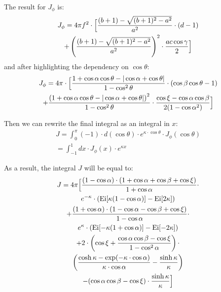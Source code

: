 The result for $J_{\phi}$ is:
\begin{multline}
J_{\phi} = 4\pi f^2 \cdot \Bigl[ \frac{(b+1) - \sqrt{(b+1)^2 - a^2}}{a^2} \cdot (d-1) \\ 
+ \left(\frac{(b+1) - \sqrt{(b+1)^2 - a^2}}{a^2}\right)^2 \cdot \frac{ac \cos \gamma}{2} \Bigr]
\end{multline}
and after highlighting the dependency on $\cos\theta$:
\begin{multline}
J_{\phi} = 4\pi \cdot \Bigl[ \frac{1 + \cos \alpha \cos \theta - |\cos \alpha + \cos \theta|}{1 - \cos^2 \theta} \cdot (\cos \beta \cos \theta - 1) \\ 
+ \frac{\left(1 + \cos \alpha \cos \theta - |\cos \alpha + \cos \theta|\right)^2}{1 - \cos^2 \theta} \cdot \frac{\cos \xi - \cos \alpha \cos \beta}{2 (1 - \cos \alpha^2)}\Bigr] 
\end{multline}

Then we can rewrite the final integral as an integral in $x$:
\begin{multline}
J = \int_{0}^{\pi} (-1) \cdot d(\cos \theta) \cdot e^{\kappa \cdot \cos \theta} \cdot J_{\phi}(\cos \theta) \\
= \int_{-1}^{1} dx \cdot J_{\phi}(x) \cdot e^{\kappa x} 
\end{multline}

As a result, the integral $J$ will be equal to:
\begin{multline}
J = 4 \pi \Bigl[ \frac{(1-\cos \alpha) \cdot (1 + \cos \alpha + \cos \beta + \cos \xi)}{1 + \cos \alpha} \cdot \\ 
e^{-\kappa} \cdot \left(\text{Ei} [\kappa(1 - \cos \alpha)] - \text{Ei}[2\kappa] \right) \\
+ \frac{(1+\cos \alpha) \cdot (1 - \cos \alpha - \cos \beta + \cos \xi)}{1 - \cos \alpha} \cdot \\ 
e^{\kappa} \cdot \left(\text{Ei} [- \kappa(1 + \cos \alpha)] - \text{Ei}[-2\kappa] \right) \\ +  2 \cdot \left(\cos \xi + \frac{\cos \alpha \cos \beta - \cos \xi}{1 - \cos^2 \alpha}\right) \cdot \\ \left(\frac{\cosh \kappa - \exp(-\kappa \cdot \cos \alpha)}{\kappa \cdot \cos \alpha} - \frac{\sinh \kappa}{\kappa} \right) \\ - 
(\cos \alpha \cos \beta - \cos \xi) \cdot \frac{\sinh \kappa}{\kappa} \Bigr]
\end{multline}



